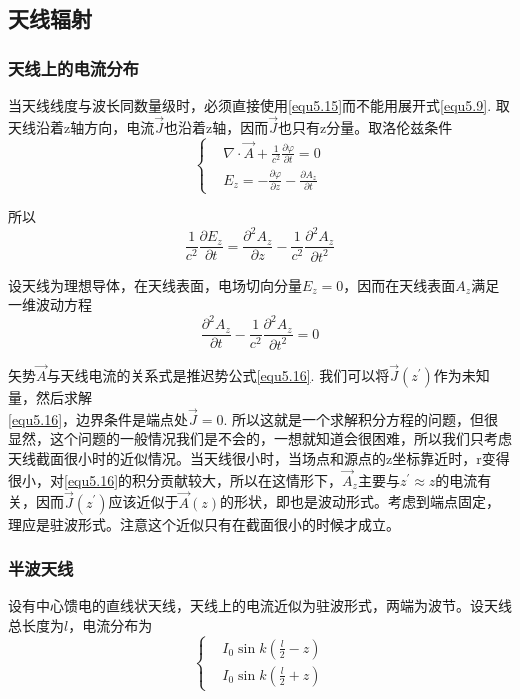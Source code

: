 \documentclass[UTF8]{ctexart}
\begin{document}
    \subsection{天线辐射}
    \subsubsection{天线上的电流分布}
    当天线线度与波长同数量级时，必须直接使用\autoref{equ5.15}而不能用展开式\autoref{equ5.9}. 取天线沿着z轴方向，电流$\vec{J}$也沿着z轴，因而$\vec{J}$也只有z分量。取洛伦兹条件
    \begin{equation}
        \left \{ \begin{aligned}
            &\nabla \cdot \vec{A} + \frac{1}{c^2} \frac{\partial \varphi}{\partial t} = 0 \\ 
            &E_z = - \frac{\partial \varphi}{\partial z} - \frac{\partial A_z}{\partial t}
        \end{aligned} \right.
    \end{equation}

\noindent 所以 
\begin{equation}
    \frac{1}{c^2} \frac{\partial E_z}{\partial t} = \frac{\partial^2 A_z}{\partial z} - \frac{1}{c^2} \frac{\partial^2 A_z}{\partial t^2}
\end{equation}

    设天线为理想导体，在天线表面，电场切向分量$E_z = 0$，因而在天线表面$A_z$满足一维波动方程 
    \begin{equation}
        \frac{\partial^2 A_z}{\partial t} - \frac{1}{c^2} \frac{\partial^2 A_z}{\partial t^2} = 0
    \end{equation}

\noindent 矢势$\vec{A}$与天线电流的关系式是推迟势公式\autoref{equ5.16}. 我们可以将$\vec{J}(z^{\prime})$作为未知量，然后求解\\
\autoref{equ5.16}，边界条件是端点处$\vec{J} = 0$. 所以这就是一个求解积分方程的问题，但很显然，这个问题的一般情况我们是不会的，一想就知道会很困难，所以我们只考虑天线截面很小时的近似情况。当天线很小时，当场点和源点的z坐标靠近时，r变得很小，对\autoref{equ5.16}的积分贡献较大，所以在这情形下，$\vec{A}_z$主要与$z^{\prime} \approx z$的电流有关，因而$\vec{J}(z^{\prime})$应该近似于$\vec{A}(z)$的形状，即也是波动形式。考虑到端点固定，理应是驻波形式。注意这个近似只有在截面很小的时候才成立。

    \subsubsection{半波天线}
    设有中心馈电的直线状天线，天线上的电流近似为驻波形式，两端为波节。设天线总长度为$l$，电流分布为 
    \begin{equation}
        \left \{ \begin{aligned}
            &I_0 \sin k\left(\frac{l}{2} - z\right) \\
            &I_0 \sin k\left(\frac{l}{2} + z\right) 
        \end{aligned} \right.
    \end{equation}
\end{document}
